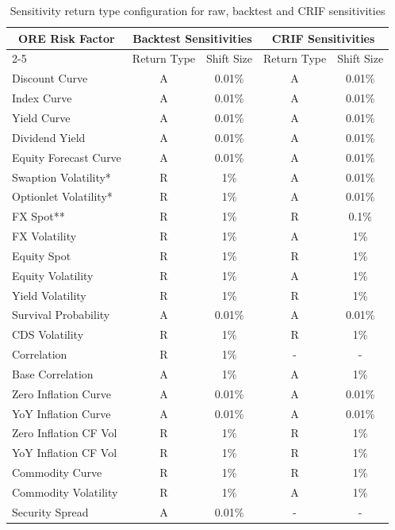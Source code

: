 \begin{table}[ht]
  \begin{tabular}{|l|c|c|c|c|}
    \hline
    \multicolumn{1}{|c|}{\multirow{2}{*}{ORE Risk Factor}} & \multicolumn{2}{c|}{Backtest Sensitivities} & \multicolumn{2}{c|}{CRIF Sensitivities} \\ \cline{2-5}
    \multicolumn{1}{|c|}{} & \multicolumn{1}{c|}{Return Type} & \multicolumn{1}{c|}{Shift Size} & \multicolumn{1}{c|}{Return Type} & \multicolumn{1}{c|}{Shift Size} \\ \hline
    Discount Curve & A & 0.01\% & A & 0.01\% \\
    Index Curve & A & 0.01\% & A & 0.01\% \\
    Yield Curve & A & 0.01\% & A & 0.01\% \\
    Dividend Yield & A & 0.01\% & A & 0.01\% \\
    Equity Forecast Curve & A & 0.01\% & A & 0.01\% \\
    Swaption Volatility* & R & 1\% & A & 0.01\% \\
    Optionlet Volatility* & R & 1\% & A & 0.01\% \\
    FX Spot** & R & 1\% & R & 0.1\% \\
    FX Volatility & R & 1\% & A & 1\% \\
    Equity Spot & R & 1\% & R & 1\% \\
    Equity Volatility & R & 1\% & A & 1\% \\
    Yield Volatility & R & 1\% & R & 1\% \\
    Survival Probability & A & 0.01\% & A & 0.01\% \\
    CDS Volatility & R & 1\% & R & 1\% \\
    Correlation & R & 1\% & - & - \\
    Base Correlation & A & 1\% & A & 1\% \\
    Zero Inflation Curve & A & 0.01\% & A & 0.01\% \\
    YoY Inflation Curve & A & 0.01\% & A & 0.01\% \\
    Zero Inflation CF Vol & R & 1\% & R & 1\% \\
    YoY Inflation CF Vol & R & 1\% & R & 1\% \\
    Commodity Curve & R & 1\% & R & 1\% \\
    Commodity Volatility & R & 1\% & A & 1\% \\
    Security Spread & A & 0.01\% & - & - \\ \hline
  \end{tabular}
  \caption{Sensitivity return type configuration for raw, backtest and CRIF sensitivities}
  \label{sensiReturnTypes}
\end{table}

